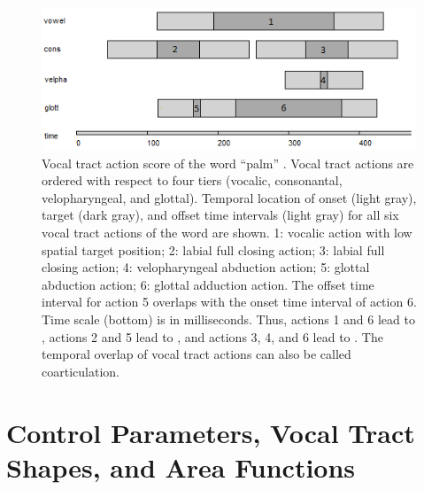 \documentclass[conference]{IEEEtran}
\let\ipa\textipa
\begin{document}
\begin{figure}[!t]
\centering
\includegraphics[width=\columnwidth]{actions}
\caption{Vocal tract action score of the word ``palm'' \ipa{[pAm]}. Vocal
  tract actions are ordered with respect to four tiers (vocalic,
  consonantal, velopharyngeal, and glottal). Temporal location of
  onset (light gray), target (dark gray), and offset time intervals
  (light gray) for all six vocal tract actions of the word are shown.
  1: vocalic action with low spatial target position; 2: labial full
  closing action; 3: labial full closing action; 4: velopharyngeal
  abduction action; 5: glottal abduction action; 6: glottal adduction
  action. The offset time interval for action 5 overlaps with the
  onset time interval of action 6. Time scale (bottom) is in milliseconds.
  Thus, actions 1 and 6 lead to \ipa{[A]}, actions 2 and 5 lead to
  \ipa{[p]}, and actions 3, 4, and 6 lead to \ipa{[m]}.
  The temporal overlap of vocal tract
  actions can also be called coarticulation.}
\label{fig:actions}
\end{figure}

\section{Control Parameters, Vocal Tract Shapes, and Area Functions}
\end{document}
